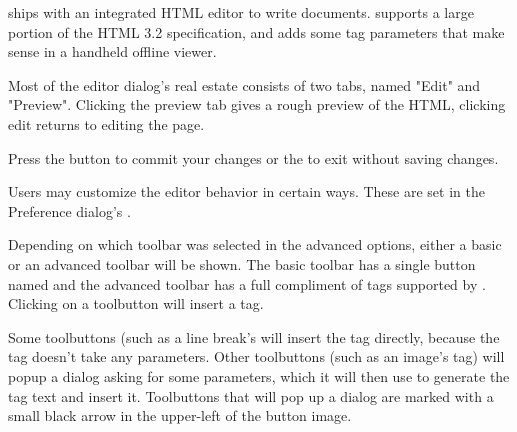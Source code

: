 \brandingapplicationdesktopname ships with an integrated HTML editor to write \brandingapplicationsuitename documents.
\brandingapplicationsuitename supports a large portion of the HTML 3.2 specification, and adds some
tag parameters that make sense in a handheld offline viewer.

Most of the editor dialog's real estate consists of two tabs, named "Edit" and 
"Preview". Clicking the preview tab gives a rough preview of the HTML, clicking
edit returns to editing the page. 


Press the  button to commit your changes or the 
 to exit without saving changes.

Users may customize the editor behavior in certain ways. These are set in the 
Preference dialog's
\helpignore{\ref{sec:pd-preferences-dialog-editor-tab}}
.

Depending on which toolbar was selected in the advanced options, either a basic
or an advanced toolbar will be shown. The basic toolbar has a single button
named  and the advanced toolbar has a
full compliment of tags supported by \brandingapplicationsuitename. Clicking on a toolbutton will
insert a tag.



Some toolbuttons (such as a line break's  will insert the tag 
directly, because the tag doesn't take any parameters. Other toolbuttons 
(such as an image's  tag) will popup a dialog asking for some 
parameters, which it will then use to generate the tag text and insert it. 
Toolbuttons that will pop up a dialog are marked with a small black arrow in 
the upper-left of the button image. 

